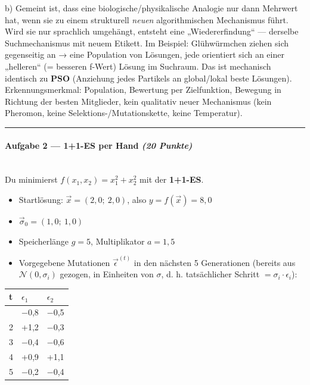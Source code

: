 \documentclass[11pt, a4paper]{article}
\begin{document}
b) Gemeint ist, dass eine biologische/physikalische Analogie nur dann Mehrwert hat, wenn sie zu einem strukturell \textit{neuen} algorithmischen Mechanismus führt. Wird sie nur sprachlich umgehängt, entsteht eine „Wiedererfindung“ — derselbe Suchmechanismus mit neuem Etikett. Im Beispiel: Glühwürmchen ziehen sich gegenseitig an → eine Population von Lösungen, jede orientiert sich an einer „helleren“ (= besseren f-Wert) Lösung im Suchraum. Das ist mechanisch identisch zu \textbf{PSO} (Anziehung jedes Partikels an global/lokal beste Lösungen). Erkennungsmerkmal: Population, Bewertung per Zielfunktion, Bewegung in Richtung der besten Mitglieder, kein qualitativ neuer Mechanismus (kein Pheromon, keine Selektions-/Mutationskette, keine Temperatur).



\noindent\textcolor{rulegray}{\rule{\linewidth}{0.4pt}}


\paragraph{Aufgabe 2 — 1+1-ES per Hand \textit{(20 Punkte)}}\mbox{}\\[2pt]

Du minimierst $f(x_1, x_2) = x_1^2 + x_2^2$ mit der \textbf{1+1-ES}.


\begin{itemize}
  \item Startlösung: $\vec{x} = (2{,}0;\ 2{,}0)$, also $y = f(\vec x) = 8{,}0$
  \item $\vec\sigma_0 = (1{,}0;\ 1{,}0)$
  \item Speicherlänge $g = 5$, Multiplikator $a = 1{,}5$
  \item Vorgegebene Mutationen $\vec\epsilon^{(t)}$ in den nächsten 5 Generationen (bereits aus $\mathcal N(0,\sigma_i)$ gezogen, in Einheiten von $\sigma$, d. h. tatsächlicher Schritt $= \sigma_i \cdot \epsilon_i$):
\end{itemize}


{\small
\begin{tabularx}{\linewidth}{XXX}
\hline
\rowcolor{tableheadbg}
{\color{white}\textbf{t}} & {\color{white}\textbf{$\epsilon_1$}} & {\color{white}\textbf{$\epsilon_2$}} \\[2pt]
\hline
\endhead
\hline
\endfoot
1 & −0,8 & −0,5 \\
2 & +1,2 & −0,3 \\
3 & −0,4 & −0,6 \\
4 & +0,9 & +1,1 \\
5 & −0,2 & −0,4 \\
\end{tabularx}
}
\end{document}
